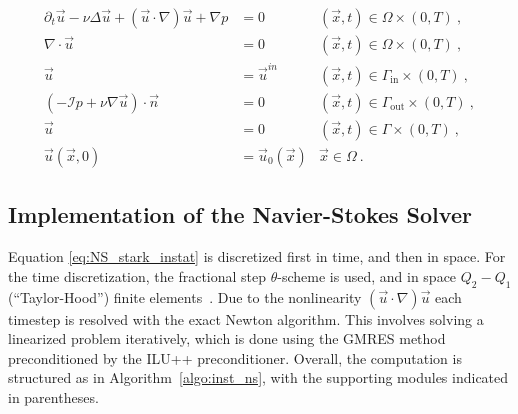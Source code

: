 \begin{equation}
  \begin{aligned}
    \partial_t{\vec{u}} - \nu \Delta \vec{u} + \left(\vec{u} \cdot \nabla \right) \vec{u} + \nabla p & = 0 & \left(\vec{x}, t\right) \in \Omega \times \left(0,T\right)\ ,\\
    \nabla \cdot \vec{u} & = 0 & \left(\vec{x}, t\right) \in \Omega \times \left(0,T\right)\ ,\\ 
    \vec{u} & = \vec{u}^{in} & \left(\vec{x}, t\right) \in \Gamma_{\text{in}} \times \left(0,T\right)\ ,\\ 
    \left(-\mathcal{I} p + \nu \nabla \vec{u} \right) \cdot \vec{n} & = 0 & \left(\vec{x}, t\right) \in \Gamma_{\text{out}} \times \left(0,T\right)\ ,\\ 
    \vec{u} & = 0  & \left(\vec{x}, t\right) \in \Gamma \times \left(0,T\right)\ ,\\
    \vec{u}\left(\vec{x}, 0\right) & = \vec{u}_0\left(\vec{x}\right) &\vec{x} \in \Omega\ .
    \label{eq:NS_stark_instat}      
  \end{aligned}  
\end{equation}   

\subsection{Implementation of the Navier-Stokes Solver}

Equation \ref{eq:NS_stark_instat} is discretized first in time, and
then in space. For the time discretization, the fractional step
$\theta$-scheme is used, and in space $Q_2-Q_1$ (``Taylor-Hood'')
finite elements~\cite{brennerscott2002}. %
Due to the nonlinearity
$\left(\vec{u} \cdot \nabla \right) \vec{u}$ each timestep is resolved
with the exact Newton algorithm. This involves solving a linearized
problem iteratively, which is done using the GMRES method
preconditioned by the ILU++ \cite{iluplusplus} preconditioner. Overall,
the computation is structured as in Algorithm~\ref{algo:inst_ns}, with
the supporting modules indicated in parentheses.

